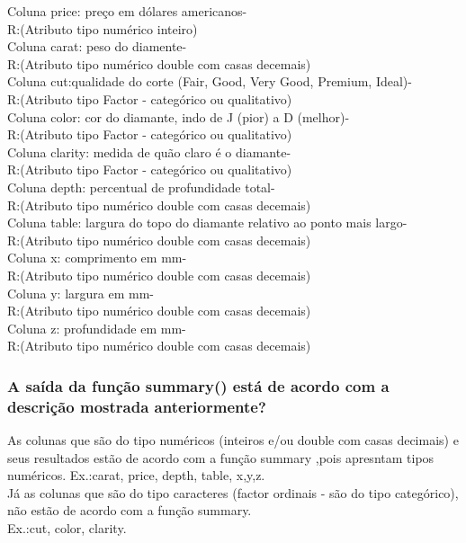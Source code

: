 \documentclass[
]{article}
\begin{document}
Coluna price: preço em dólares americanos-\\
R:(Atributo tipo numérico inteiro)\\
Coluna carat: peso do diamente-\\
R:(Atributo tipo numérico double com casas decemais)\\
Coluna cut:qualidade do corte (Fair, Good, Very Good, Premium, Ideal)-\\
R:(Atributo tipo Factor - categórico ou qualitativo)\\
Coluna color: cor do diamante, indo de J (pior) a D (melhor)-\\
R:(Atributo tipo Factor - categórico ou qualitativo)\\
Coluna clarity: medida de quão claro é o diamante-\\
R:(Atributo tipo Factor - categórico ou qualitativo)\\
Coluna depth: percentual de profundidade total-\\
R:(Atributo tipo numérico double com casas decemais)\\
Coluna table: largura do topo do diamante relativo ao ponto mais
largo-\\
R:(Atributo tipo numérico double com casas decemais)\\
Coluna x: comprimento em mm-\\
R:(Atributo tipo numérico double com casas decemais)\\
Coluna y: largura em mm-\\
R:(Atributo tipo numérico double com casas decemais)\\
Coluna z: profundidade em mm-\\
R:(Atributo tipo numérico double com casas decemais)

\hypertarget{a-sauxedda-da-funuxe7uxe3o-summary-estuxe1-de-acordo-com-a-descriuxe7uxe3o-mostrada-anteriormente}{%
\subsubsection{A saída da função summary() está de acordo com a
descrição mostrada
anteriormente?}\label{a-sauxedda-da-funuxe7uxe3o-summary-estuxe1-de-acordo-com-a-descriuxe7uxe3o-mostrada-anteriormente}}

As colunas que são do tipo numéricos (inteiros e/ou double com casas
decimais) e seus resultados estão de acordo com a função summary ,pois
apresntam tipos numéricos. Ex.:carat, price, depth, table, x,y,z.\\
Já as colunas que são do tipo caracteres (factor ordinais - são do tipo
categórico), não estão de acordo com a função summary.\\
Ex.:cut, color, clarity.
\end{document}
